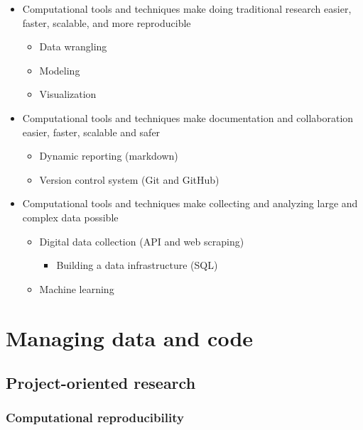 \documentclass[
]{book}
\providecommand{\tightlist}{%
  \setlength{\itemsep}{0pt}\setlength{\parskip}{0pt}}
\begin{document}
\begin{itemize}
\tightlist
\item
  Computational tools and techniques make doing traditional research easier, faster, scalable, and more reproducible

  \begin{itemize}
  \tightlist
  \item
    Data wrangling
  \item
    Modeling
  \item
    Visualization
  \end{itemize}
\item
  Computational tools and techniques make documentation and collaboration easier, faster, scalable and safer

  \begin{itemize}
  \tightlist
  \item
    Dynamic reporting (markdown)
  \item
    Version control system (Git and GitHub)
  \end{itemize}
\item
  Computational tools and techniques make collecting and analyzing large and complex data possible

  \begin{itemize}
  \tightlist
  \item
    Digital data collection (API and web scraping)

    \begin{itemize}
    \tightlist
    \item
      Building a data infrastructure (SQL)
    \end{itemize}
  \item
    Machine learning
  \end{itemize}
\end{itemize}

\hypertarget{Intro}{%
\chapter{Managing data and code}\label{Intro}}

\hypertarget{project-oriented-research}{%
\section{Project-oriented research}\label{project-oriented-research}}

\hypertarget{computational-reproducibility}{%
\subsection{Computational reproducibility}\label{computational-reproducibility}}
\end{document}
